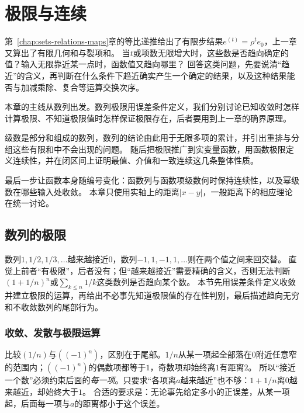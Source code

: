 \chapter{极限与连续}
\label{chap:limits-continuity}
\label{chap:function-limits}
\label{chap:mathematical-analysis}

第~\ref{chap:sets-relations-maps}章的等比递推给出了有限步结果$e^{(t)}=\rho^te_0$，上一章又算出了有限几何和与裂项和。
当$t$或项数无限增大时，这些数是否趋向确定的值？输入无限靠近某一点时，函数值又趋向哪里？
回答这类问题，先要说清“趋近”的含义，再判断在什么条件下趋近确实产生一个确定的结果，以及这种结果能否与加减乘除、复合等运算交换次序。

本章的主线从数列出发。数列极限用误差条件定义，我们分别讨论已知收敛时怎样计算极限、不知道极限值时怎样保证极限存在，后者要用到上一章的确界原理。

级数是部分和组成的数列，数列的结论由此用于无限多项的累计，并引出重排与分组这些有限和中不会出现的问题。
随后把极限推广到实变量函数，用函数极限定义连续性，并在闭区间上证明最值、介值和一致连续这几条整体性质。

最后一步让函数本身随编号变化：函数列与函数项级数何时保持连续性，以及幂级数在哪些输入处收敛。
本章只使用实轴上的距离$|x-y|$，一般距离下的相应理论在统一讨论。

\section{数列的极限}
\label{sec:ru-sequence-limits}
\label{sec:analysis-continuous-limits}
\label{sec:analysis-sequences-series-errors}

数列$1,1/2,1/3,\ldots$越来越接近$0$，数列$-1,1,-1,1,\ldots$则在两个值之间来回交替。
直觉上前者“有极限”，后者没有；但“越来越接近”需要精确的含义，否则无法判断$(1+1/n)^n$或$\sum_{k\leq n}1/k$这类数列是否趋向某个数。
本节先用误差条件定义收敛并建立极限的运算，再给出不必事先知道极限值的存在性判别，最后描述趋向无穷和不收敛数列的尾部行为。

\subsection{收敛、发散与极限运算}
\label{sec:ru-convergence-limit-laws}

比较$(1/n)$与$((-1)^n)$，区别在于尾部。$1/n$从某一项起全部落在$0$附近任意窄的范围内；$((-1)^n)$的偶数项都等于$1$，奇数项却始终离$1$有距离$2$。
所以“接近一个数”必须约束后面的\emph{每一项}。只要求“各项离$a$越来越近”也不够：$1+1/n$离$0$越来越近，却始终大于$1$。
合适的要求是：无论事先给定多小的正误差，从某一项起，后面每一项与$a$的距离都小于这个误差。

